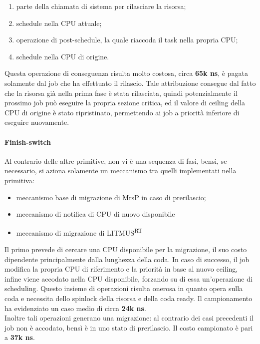 \begin{enumerate}
	\item parte della chiamata di sistema per rilasciare la risorsa;
	\item schedule nella CPU attuale;
	\item operazione di post-schedule, la quale riaccoda il task nella propria CPU;
	\item schedule nella CPU di origine.
\end{enumerate}

Questa operazione di conseguenza risulta molto costosa, circa \textbf{65k ns}, è pagata solamente dal job che ha effettuato il rilascio. Tale attribuzione consegue dal fatto che la risorsa già nella prima fase è stata rilasciata, quindi potenzialmente il prossimo job può eseguire la propria sezione critica, ed il valore di ceiling della CPU di origine è stato ripristinato, permettendo ai job a priorità inferiore di eseguire nuovamente.\\

\paragraph{Finish-switch} Al contrario delle altre primitive, non vi è una sequenza di fasi, bensì, se necessario, si aziona solamente un meccanismo tra quelli implementati nella primitiva:

\begin{itemize}
	\item meccanismo base di migrazione di MrsP in caso di prerilascio;
	\item meccanismo di notifica di CPU di nuovo disponibile
  \item meccanismo di migrazione di LITMUS\textsuperscript{RT} 
\end{itemize}

Il primo prevede di cercare una CPU disponibile per la migrazione, il suo costo dipendente principalmente dalla lunghezza della coda. In caso di successo, il job modifica la propria CPU di riferimento e la priorità in base al nuovo ceiling, infine viene accodato nella CPU disponibile, forzando su di essa un'operazione di scheduling. Questo insieme di operazioni risulta onerosa in quanto opera sulla coda e necessita dello spinlock della risorsa e della coda ready. Il campionamento ha evidenziato un caso medio di circa \textbf{24k ns}.\\

Inoltre tali operazioni generano una migrazione: al contrario dei casi precedenti il job non è accodato, bensì è in uno stato di prerilascio. Il costo campionato è pari a \textbf{37k ns}.\\

